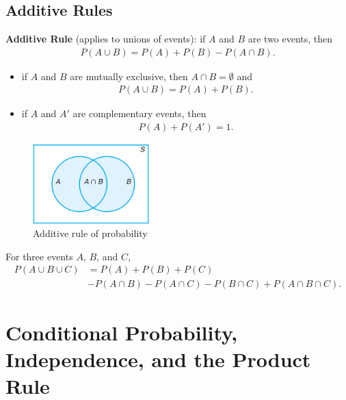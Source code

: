 \documentclass[10pt]{article}
\begin{document}
\subsection{Additive Rules}
\begin{theorem}
    \textbf{Additive Rule} (applies to unions of events): if $A$ and $B$ are two events, then
    \begin{align*}
        P(A \cup B) = P(A) + P(B) - P(A \cap B)
    .\end{align*}
    \begin{itemize}
        \item if $A$ and $B$ are mutually exclusive, then $A \cap B = \emptyset$ and
             \begin{align*}
                P(A \cup B) = P(A) + P(B)
            .\end{align*}
        \item if $A$ and $A'$ are complementary events, then
            \begin{align*}
                P(A) + P(A') = 1
            .\end{align*}
    \end{itemize}
\end{theorem}
\begin{figure}[h]
    \centering
    \includegraphics[width=0.4\textwidth]{additiveRule}
    \caption{Additive rule of probability}
    \label{fig:additiveRule}
\end{figure}
\begin{theorem}
    For three events $A$, $B$, and $C$,
    \begin{align*}
        P(A \cup B \cup C) &= P(A) + P(B) + P(C) \\ &- P(A \cap B) - P(A \cap C) - P(B \cap C) + P(A \cap B \cap C)
    .\end{align*}
\end{theorem}




\section{Conditional Probability, Independence, and the Product Rule}
\end{document}
